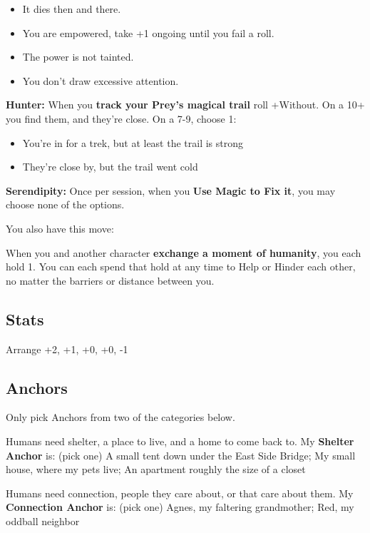 \documentclass[
  oneside,
  statementpaper,
  9pt]{memoir}
\begin{document}
\begin{itemize}
\tightlist
\item
  It dies then and there.
\item
  You are empowered, take +1 ongoing until you fail a roll.
\item
  The power is not tainted.
\item
  You don't draw excessive attention.
\end{itemize}

\textbf{Hunter:} When you \textbf{track your Prey's magical trail} roll
+Without. On a 10+ you find them, and they're close. On a 7-9, choose 1:

\begin{itemize}
\tightlist
\item
  You're in for a trek, but at least the trail is strong
\item
  They're close by, but the trail went cold
\end{itemize}

\textbf{Serendipity:} Once per session, when you \textbf{Use Magic to
Fix it}, you may choose none of the options.

You also have this move:

When you and another character \textbf{exchange a moment of humanity},
you each hold 1. You can each spend that hold at any time to Help or
Hinder each other, no matter the barriers or distance between you.

\hypertarget{stats-6}{%
\subsection{Stats}\label{stats-6}}

Arrange +2, +1, +0, +0, -1

\hypertarget{anchors-5}{%
\subsection{Anchors}\label{anchors-5}}

Only pick Anchors from two of the categories below.

Humans need shelter, a place to live, and a home to come back to. My
\textbf{Shelter Anchor} is: (pick one) A small tent down under the East
Side Bridge; My small house, where my pets live; An apartment roughly
the size of a closet

Humans need connection, people they care about, or that care about them.
My \textbf{Connection Anchor} is: (pick one) Agnes, my faltering
grandmother; Red, my oddball neighbor
\end{document}
